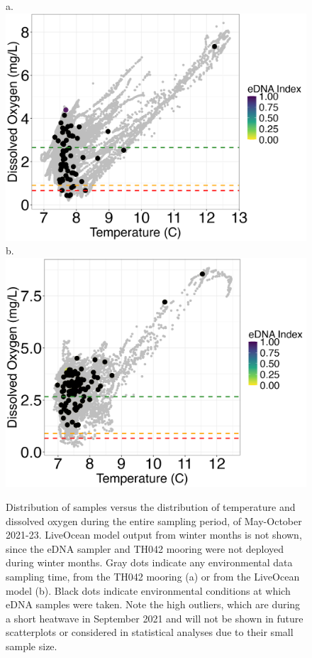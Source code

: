 \documentclass[12pt,twoside]{reedthesis}
\begin{document}
	\begin{figure}[!h]
		\begin{center}
			a. \includegraphics[scale=0.35]{Scatter_ex}
			b. \includegraphics[scale=0.35]{Scatter_ex_Mod}
			\caption[Mooring vs. Model Scatterplot]{Distribution of samples versus the distribution of temperature and dissolved oxygen during the entire sampling period, of May-October 2021-23. LiveOcean model output from winter months is not shown, since the eDNA sampler and TH042 mooring were not deployed during winter months. Gray dots indicate any environmental data sampling time, from the TH042 mooring (a) or from the LiveOcean model (b). Black dots indicate environmental conditions at which eDNA samples were taken. Note the high outliers, which are during a short heatwave in September 2021 and will not be shown in future scatterplots or considered in statistical analyses due to their small sample size.} %
		\end{center}
		\label{EnvironmentalConditions}
	\end{figure} 
	
\end{document}
